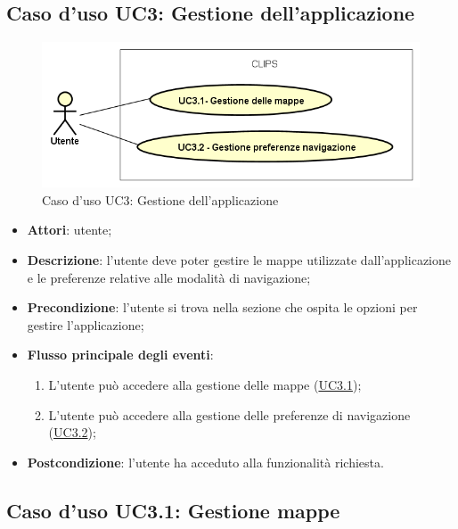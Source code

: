 \documentclass[../AnalisiDeiRequisiti.tex]{subfiles}
\begin{document}
\subsection{Caso d'uso UC3: Gestione dell'applicazione}

        \begin{figure}[!h]
            \centering
            \includegraphics[scale=0.95, width=\textwidth]{img/UC3.png}
            \caption{Caso d'uso UC3: Gestione dell'applicazione}\label{fig:UC3} 
        \end{figure}
\begin{itemize}
\item \textbf{Attori}: utente;
\item \textbf{Descrizione}: l'utente deve poter gestire le mappe utilizzate dall'applicazione e le preferenze relative alle modalità di navigazione; 
      \item \textbf{Precondizione}: l'utente si trova nella sezione che ospita le opzioni per gestire l'applicazione;

        \item \textbf{Flusso principale degli eventi}:
          \begin{enumerate}
          \item L'utente può accedere alla gestione delle mappe (\hyperlink{UC3.1}{UC3.1});
          \item L'utente può accedere alla gestione delle preferenze di navigazione (\hyperlink{UC3.2}{UC3.2});

      \end{enumerate}
    \item \textbf{Postcondizione}: l'utente ha acceduto alla funzionalità richiesta.
  \end{itemize}
\hypertarget{UC3.1}{}
\subsection{Caso d'uso UC3.1: Gestione mappe}
\end{document}
